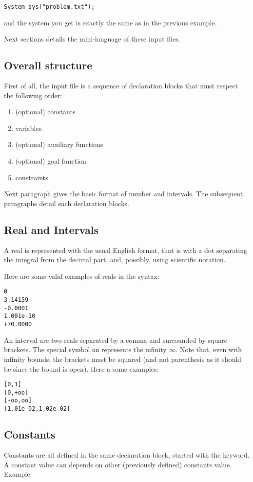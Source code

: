 \begin{lstlisting}
System sys("problem.txt");
\end{lstlisting}

and the system you get is exactly the same as in the previous example.

Next sections details the mini-language of these input files. 

\subsection{Overall structure}
First of all, the input file is a sequence of declaration blocks that must respect the following order:
\begin{enumerate}
\item (optional) constants
\item variables
\item (optional) auxiliary functions
\item (optional) goal function
\item constraints
\end{enumerate}

Next paragraph gives the basic format of number and intervals.
The subsequent paragraphs detail each declaration blocks.

\subsection{Real and Intervals}
A real is represented with the usual English format, that is
with a dot separating the integral from the decimal part,
and, possibly, using scientific notation.

Here are some valid examples of reals in the syntax:
\begin{verbatim}
0
3.14159
-0.0001
1.001e-10
+70.0000
\end{verbatim}
 
An interval are two reals separated by a comma
and surrounded by square brackets. The special symbol
{\tt oo} represents the infinity $\infty$.
Note that, even with infinity bounds, the brackets
must be squared (and not parenthesis as it should be since the
bound is open). Here a some examples:

\begin{verbatim}
[0,1]
[0,+oo]
[-oo,oo]
[1.01e-02,1.02e-02]
\end{verbatim}

\subsection{Constants}
Constants are all defined in the same declaration block, 
started with the  keyword.
A constant value can depends on other (previously defined) constants value. Example:

